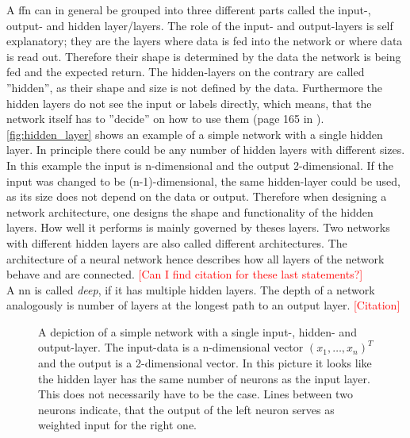 A \gls{ffn} can in general be grouped into three different parts called the input-, output- and hidden layer/layers. The role of the input- and output-layers is self explanatory; they are the layers where data is fed into the network or where data is read out. Therefore their shape is determined by the data the network is being fed and the expected return. The hidden-layers on the contrary are called ''hidden'', as their shape and size is not defined by the data. Furthermore the hidden layers do not see the input or labels directly, which means, that the network itself has to ''decide'' on how to use them (page 165 in \cite{deep_learning_book}). \autoref{fig:hidden_layer} shows an example of a simple network with a single hidden layer. In principle there could be any number of hidden layers with different sizes. In this example the input is n-dimensional and the output 2-dimensional. If the input was changed to be (n-1)-dimensional, the same hidden-layer could be used, as its size does not depend on the data or output. Therefore when designing a network architecture, one designs the shape and functionality of the hidden layers. How well it performs is mainly governed by theses layers. Two networks with different hidden layers are also called different architectures. The architecture of a neural network hence describes how all layers of the network behave and are connected. \textcolor{red}{[Can I find citation for these last statements?]}\\
A \gls{nn} is called \emph{deep}, if it has multiple hidden layers. The depth of a network analogously is number of layers at the longest path to an output layer. \textcolor{red}{[Citation]}
\begin{figure}
\centering

\caption[Simple neural network]{A depiction of a simple network with a single input-, hidden- and output-layer. The input-data is a n-dimensional vector ${(x_1, \dotsc, x_n)}^T$ and the output is a 2-dimensional vector. In this picture it looks like the hidden layer has the same number of neurons as the input layer. This does not necessarily have to be the case. Lines between two neurons indicate, that the output of the left neuron serves as weighted input for the right one.}\label{fig:hidden_layer}
\end{figure}

